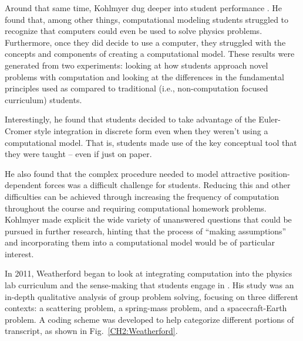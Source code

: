 \documentclass{msuphddissertation}
\begin{document}
\begin{doublespace}
Around that same time, Kohlmyer dug deeper into student performance \cite{Kohlmyer2005}.  He found that, among other things, computational modeling students struggled to recognize that computers could even be used to solve physics problems.  Furthermore, once they did decide to use a computer, they struggled with the concepts and components of creating a computational model.  These results were generated from two experiments: looking at how students approach novel problems with computation and looking at the differences in the fundamental principles used as compared to traditional (i.e., non-computation focused curriculum) students.

Interestingly, he found that students decided to take advantage of the Euler-Cromer style integration in discrete form even when they weren't using a computational model.  That is, students made use of the key conceptual tool that they were taught -- even if just on paper.

He also found that the complex procedure needed to model attractive position-dependent forces was a difficult challenge for students.  Reducing this and other difficulties can be achieved through increasing the frequency of computation throughout the course and requiring computational homework problems.  Kohlmyer made explicit the wide variety of unanswered questions that could be pursued in further research, hinting that the process of ``making assumptions'' and incorporating them into a computational model would be of particular interest.

In 2011, Weatherford began to look at integrating computation into the physics lab curriculum and the sense-making that students engage in \cite{Weatherford2011}.  His study was an in-depth qualitative analysis of group problem solving, focusing on three different contexts: a scattering problem, a spring-mass problem, and a spacecraft-Earth problem.  A coding scheme was developed to help categorize different portions of transcript, as shown in Fig.~\ref{CH2:Weatherford}.


\end{doublespace}
\end{document}

